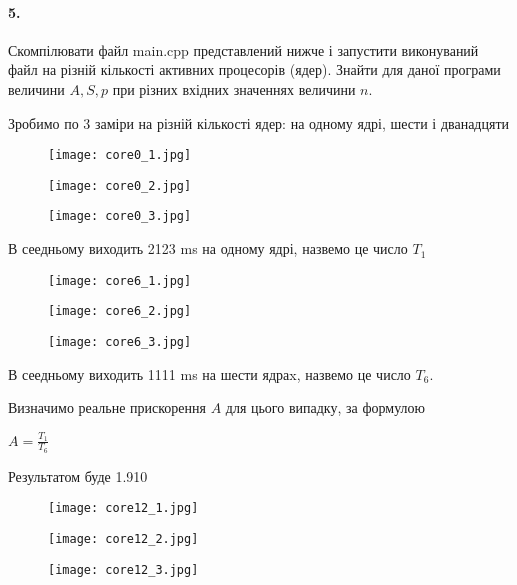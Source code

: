 \documentclass[12pt]{extarticle}
\begin{document}
\paragraph{5.}
Скомпілювати файл main.cpp представлений нижче і запустити
виконуваний файл на різній кількості активних процесорів (ядер). Знайти для
даної програми величини $A, S, p$ при різних вхідних значеннях величини $n$.

\vspace{12pt}

Зробимо по 3 заміри на різній кількості ядер: на одному ядрі, шести і дванадцяти

\begin{figure}[H]
    \centering
    \texttt{[image: core0\_1.jpg]}
    \caption{}
\end{figure}
\begin{figure}[H]
    \centering
    \texttt{[image: core0\_2.jpg]}
    \caption{}
\end{figure}
\begin{figure}[H]
    \centering
    \texttt{[image: core0\_3.jpg]}
    \caption{}
\end{figure}

В сеедньому виходить 2123 ms на одному ядрі, назвемо це число $T_1$

\begin{figure}[H]
    \centering
    \texttt{[image: core6\_1.jpg]}
    \caption{}
\end{figure}
\begin{figure}[H]
    \centering
    \texttt{[image: core6\_2.jpg]}
    \caption{}
\end{figure}
\begin{figure}[H]
    \centering
    \texttt{[image: core6\_3.jpg]}
    \caption{}
\end{figure}

В сеедньому виходить 1111 ms на шести ядраx, назвемо це число $T_6$.

Визначимо реальне прискорення $A$ для цього випадку, за формулою 
\vspace{12pt}

$A = \frac{T_1}{T_6}$

Результатом буде 1.910

\begin{figure}[H]
    \centering
    \texttt{[image: core12\_1.jpg]}
    \caption{}
\end{figure}
\begin{figure}[H]
    \centering
    \texttt{[image: core12\_2.jpg]}
    \caption{}
\end{figure}
\begin{figure}[H]
    \centering
    \texttt{[image: core12\_3.jpg]}
    \caption{}
\end{figure}
\end{document}
